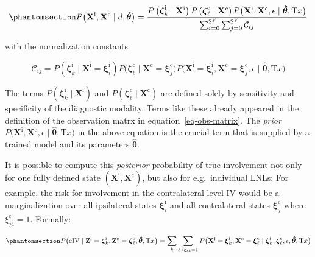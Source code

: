 \documentclass[
  sn-mathphys-num,
]{sn-jnl}
\begin{document}
\begin{equation}\phantomsection\label{eq-uni-bayes-law}{
P \big( \mathbf{X}^\text{i}, \mathbf{X}^\text{c} \mid d, \boldsymbol{\hat{\theta}} \big)
= \frac{P \left( \boldsymbol{\zeta}^\text{i}_k \mid \mathbf{X}^\text{i} \right) P \left( \boldsymbol{\zeta}^\text{c}_\ell \mid \mathbf{X}^\text{c} \right) P \big( \mathbf{X}^\text{i}, \mathbf{X}^\text{c}, \epsilon \mid \boldsymbol{\hat{\theta}}, \text{T}x \big)}
{\sum_{i=0}^{2^V} \sum_{j=0}^{2^V} \mathcal{C}_{ij}}
}\end{equation}

with the normalization constants

\[
\mathcal{C}_{ij} = P \left( \boldsymbol{\zeta}^\text{i}_k \mid \mathbf{X}^\text{i}=\boldsymbol{\xi}^\text{i}_i \right) P \big( \boldsymbol{\zeta}^\text{c}_\ell \mid \mathbf{X}^\text{c}=\boldsymbol{\xi}^\text{c}_j \big) P \big( \mathbf{X}^\text{i}=\boldsymbol{\xi}^\text{i}_i, \mathbf{X}^\text{c}=\boldsymbol{\xi}^\text{c}_j, \epsilon \mid \boldsymbol{\hat{\theta}}, \text{T}x \big)
\]

The terms
\(P \left( \boldsymbol{\zeta}^\text{i}_k \mid \mathbf{X}^\text{i} \right)\)
and
\(P \left( \boldsymbol{\zeta}^\text{c}_\ell \mid \mathbf{X}^\text{c} \right)\)
are defined solely by sensitivity and specificity of the diagnostic
modality. Terms like these already appeared in the definition of the
observation matrx in equation~\ref{eq-obs-matrix}. The \emph{prior}
\(P \big( \mathbf{X}^\text{i}, \mathbf{X}^\text{c}, \epsilon \mid \boldsymbol{\hat{\theta}}, \text{T}x \big)\)
in the above equation is the crucial term that is supplied by a trained
model and its parameters \(\boldsymbol{\hat{\theta}}\).

It is possible to compute this \emph{posterior} probability of true
involvement not only for one fully defined state
\((\mathbf{X}^\text{i}, \mathbf{X}^\text{c})\), but also for
e.g.~individual LNLs: For example, the risk for involvement in the
contralateral level IV would be a marginalization over all ipsilateral
states \(\boldsymbol{\xi}^\text{i}_i\) and all contralateral states
\(\boldsymbol{\xi}^\text{c}_j\) where \(\xi^\text{c}_{j4}=1\). Formally:

\begin{equation}\phantomsection\label{eq-marg-over-posterior}{
P \big( \text{cIV} \mid \mathbf{Z}^\text{i}=\boldsymbol{\zeta}^\text{i}_k, \mathbf{Z}^\text{c}=\boldsymbol{\zeta}^\text{c}_\ell, \boldsymbol{\hat{\theta}}, \text{T}x \big) = \sum_k \sum_{\ell \, : \, \xi_{\ell 4}=1} P \big( \mathbf{X}^\text{i} = \boldsymbol{\xi}^\text{i}_k, \mathbf{X}^\text{c} = \boldsymbol{\xi}^\text{c}_\ell \mid \boldsymbol{\zeta}^\text{i}_k, \boldsymbol{\zeta}^\text{c}_\ell, \epsilon, \boldsymbol{\hat{\theta}}, \text{T}x \big)
}\end{equation}
\end{document}
